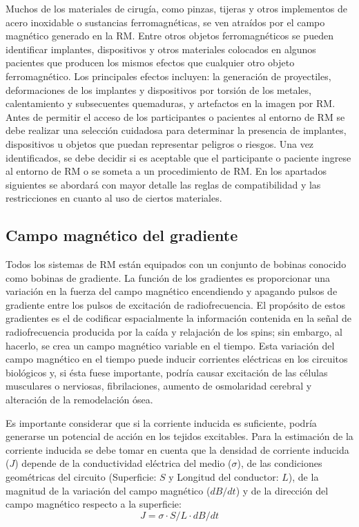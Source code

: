 Muchos de los materiales de cirugía, como pinzas, tijeras y otros implementos de acero inoxidable o sustancias ferromagnéticas, se ven atraídos por el campo magnético generado en la RM. Entre otros objetos ferromagnéticos se pueden identificar implantes, dispositivos y otros materiales colocados en algunos pacientes que producen los mismos efectos que cualquier otro objeto ferromagnético. Los principales efectos incluyen: la generación de proyectiles, deformaciones de los implantes y dispositivos por torsión de los metales, calentamiento y subsecuentes quemaduras, y artefactos en la imagen por RM. Antes de permitir el acceso de los participantes o pacientes al entorno de RM se debe realizar una selección cuidadosa para determinar la presencia de implantes, dispositivos u objetos que puedan representar peligros o riesgos. Una vez identificados, se debe decidir si es aceptable que el participante o paciente ingrese al entorno de RM o se someta a un procedimiento de RM. En los apartados siguientes se abordará con mayor detalle las reglas de compatibilidad y las restricciones en cuanto al uso de ciertos materiales.

\subsection{Campo magnético del gradiente}
Todos los sistemas de RM están equipados con un conjunto de bobinas conocido como bobinas de gradiente. La función de los gradientes es proporcionar una variación en la fuerza del campo magnético encendiendo y apagando  pulsos de gradiente entre los pulsos de excitación de radiofrecuencia. El propósito de estos gradientes es el de codificar espacialmente la información contenida en la señal de radiofrecuencia producida por la caída y relajación de los spins; sin embargo, al hacerlo, se crea un campo magnético variable en el tiempo. Esta variación del campo magnético en el tiempo puede inducir corrientes eléctricas en los circuitos biológicos y, si ésta fuese importante, podría causar excitación de las células musculares o nerviosas, fibrilaciones, aumento de osmolaridad cerebral y alteración de la remodelación ósea.

Es importante considerar que si la corriente inducida es suficiente, podría generarse un potencial de acción en los tejidos excitables. Para la estimación de la corriente inducida se debe tomar en cuenta que la densidad de corriente inducida ($J$) depende de la conductividad eléctrica del medio ($\sigma$), de las condiciones geométricas del circuito (Superficie: $S$ y Longitud del conductor: $L$), de la magnitud de la variación del campo magnético ($dB/dt$) y de la dirección del campo magnético respecto a la superficie:
\begin{equation}
  J = \sigma \cdot S/L \cdot dB/dt
\end{equation}

